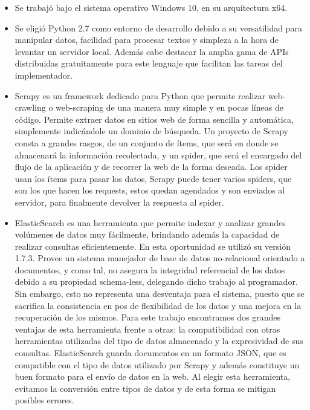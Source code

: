 \documentclass[12pt]{article} %
\begin{document}
\begin{itemize}
	\item Se trabajó bajo el sistema operativo Windows 10, en su arquitectura x64.
	\item Se eligió Python 2.7 como entorno de desarrollo debido a su versatilidad para manipular datos, facilidad para procesar textos y simpleza a la hora de levantar un servidor local. Además cabe destacar la amplia gama de APIs distribuidas gratuitamente para este lenguaje que facilitan las tareas del implementador.
	\item Scrapy \cite{Scrapy} es un framework dedicado para Python que permite realizar web-crawling o web-scraping de una manera muy simple y en pocas líneas de código. Permite extraer datos en sitios web de forma sencilla y automática, simplemente indicándole un dominio de búsqueda.
	Un proyecto de Scrapy consta a grandes rasgos, de un conjunto de ítems, que será en donde se almacenará la información recolectada, y un spider, que será el encargado del flujo de la aplicación y de recorrer la web de la forma deseada.
Los spider \cite{Scrapy2} usan los ítems para pasar los datos, Scrapy puede tener varios spiders, que son los que hacen los requests, estos quedan agendados y son enviados al  servidor, para finalmente devolver la respuesta al spider. 
	\item ElasticSearch \cite{ElasticSearch} es una herramienta que permite indexar y analizar grandes volúmenes de datos muy fácilmente, brindando además la capacidad de realizar consultas eficientemente. En esta oportunidad se utilizó su versión 1.7.3. Provee un sistema manejador de base de datos no-relacional orientado a documentos, y como tal, no asegura la integridad referencial de los datos debido a su propiedad schema-less, delegando dicho trabajo al programador. Sin embargo, esto no representa una desventaja para el sistema, puesto que se sacrifica la consistencia en pos de flexibilidad de los datos y una mejora en la recuperación de los mismos. 
Para este trabajo encontramos dos grandes ventajas de esta herramienta frente a otras: la compatibilidad con otras herramientas utilizadas del tipo de datos almacenado y la expresividad de sus consultas. 
ElasticSearch guarda documentos en un formato JSON, que es compatible con el tipo de datos utilizado por Scrapy y además constituye un buen formato para el envío de datos en la web. Al elegir esta herramienta, evitamos la conversión entre tipos de datos y de esta forma se mitigan posibles errores.
\end{itemize}
\end{document}
